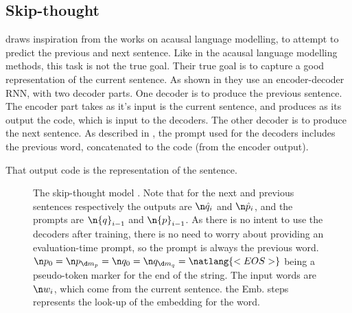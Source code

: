 {\subsection{Skip-thought}
 draws inspiration from the works on acausal language modelling, to attempt to predict the previous and next sentence.
Like in the acausal language modelling methods, this task is not the true goal.
Their true goal is to capture a good representation of the current sentence.
As shown in  they use an encoder-decoder RNN, with two decoder parts.
One decoder is to produce the previous sentence.
The encoder part takes as it's input is the current sentence, and produces as its  output the code,
which is input to the decoders.
The other decoder is to produce the next sentence.
As described in , the prompt used for the decoders includes the previous word, concatenated to the code (from the encoder output).

That output code is the representation of the sentence.

\begin{figure}
	\caption{The skip-thought model \parencite{DBLP:journals/corr/KirosZSZTUF15}.
		Note that for the next and previous sentences respectively the outputs are $\n \hat{q}_i$ and $\n \hat{p}_i$,
		and the prompts are $\n {q}_{i-1}$ and $\n {p}_{i-1}$.
		As there is no intent to use the decoders after training, there is no need to worry about providing an evaluation-time prompt, so the prompt is always the previous word.
		$\n p_0= \n p_{\d m_p} = \n q_0= \n q_{\d m_q} =  \natlang{<EOS>}$ being a pseudo-token marker for the end of the string.
		The input words are $\n w_i$, which come from the current sentence.
		the Emb. steps represents the look-up of the embedding for the word.
	}
	\label{fig:skip-thought}
	
\end{figure}}
